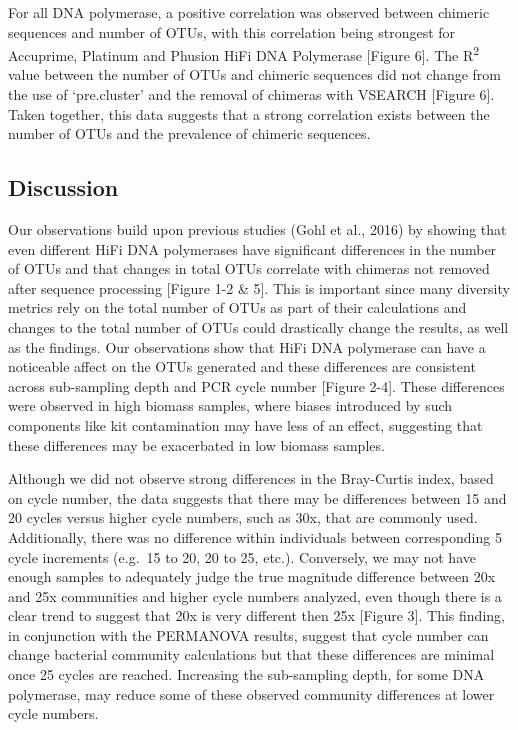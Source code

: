 \documentclass[12pt,]{article}
\begin{document}
For all DNA polymerase, a positive correlation was observed between
chimeric sequences and number of OTUs, with this correlation being
strongest for Accuprime, Platinum and Phusion HiFi DNA Polymerase
{[}Figure 6{]}. The R\textsuperscript{2} value between the number of
OTUs and chimeric sequences did not change from the use of `pre.cluster'
and the removal of chimeras with VSEARCH {[}Figure 6{]}. Taken together,
this data suggests that a strong correlation exists between the number
of OTUs and the prevalence of chimeric sequences.

\newpage

\subsection{Discussion}\label{discussion}

Our observations build upon previous studies (Gohl et al., 2016) by
showing that even different HiFi DNA polymerases have significant
differences in the number of OTUs and that changes in total OTUs
correlate with chimeras not removed after sequence processing {[}Figure
1-2 \& 5{]}. This is important since many diversity metrics rely on the
total number of OTUs as part of their calculations and changes to the
total number of OTUs could drastically change the results, as well as
the findings. Our observations show that HiFi DNA polymerase can have a
noticeable affect on the OTUs generated and these differences are
consistent across sub-sampling depth and PCR cycle number {[}Figure
2-4{]}. These differences were observed in high biomass samples, where
biases introduced by such components like kit contamination may have
less of an effect, suggesting that these differences may be exacerbated
in low biomass samples.

Although we did not observe strong differences in the Bray-Curtis index,
based on cycle number, the data suggests that there may be differences
between 15 and 20 cycles versus higher cycle numbers, such as 30x, that
are commonly used. Additionally, there was no difference within
individuals between corresponding 5 cycle increments (e.g.~15 to 20, 20
to 25, etc.). Conversely, we may not have enough samples to adequately
judge the true magnitude difference between 20x and 25x communities and
higher cycle numbers analyzed, even though there is a clear trend to
suggest that 20x is very different then 25x {[}Figure 3{]}. This
finding, in conjunction with the PERMANOVA results, suggest that cycle
number can change bacterial community calculations but that these
differences are minimal once 25 cycles are reached. Increasing the
sub-sampling depth, for some DNA polymerase, may reduce some of these
observed community differences at lower cycle numbers.
\end{document}
